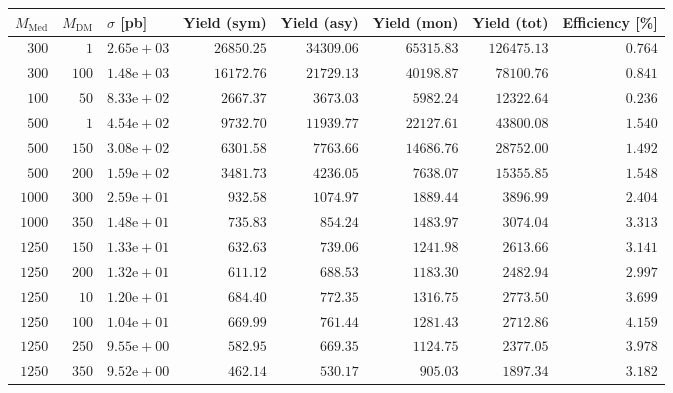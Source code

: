 \begin{table}
    \centering
    {\small
    \begin{tabular}{rrlrrrrr}
    \hline\hline
    $M_{\text{Med}}$ & $M_{\text{DM}}$ & $\sigma$ [pb] & Yield (sym) & Yield (asy) & Yield (mon) & Yield (tot) & Efficiency [\%] \\
    \hline
    $300$ & $1$ & $2.65\text{e}+03$ & $26850.25$ & $34309.06$ & $65315.83$ & $126475.13$ & $0.764$ \\
    $300$ & $100$ & $1.48\text{e}+03$ & $16172.76$ & $21729.13$ & $40198.87$ & $78100.76$ & $0.841$ \\
    $100$ & $50$ & $8.33\text{e}+02$ & $2667.37$ & $3673.03$ & $5982.24$ & $12322.64$ & $0.236$ \\
    $500$ & $1$ & $4.54\text{e}+02$ & $9732.70$ & $11939.77$ & $22127.61$ & $43800.08$ & $1.540$ \\
    $500$ & $150$ & $3.08\text{e}+02$ & $6301.58$ & $7763.66$ & $14686.76$ & $28752.00$ & $1.492$ \\
    $500$ & $200$ & $1.59\text{e}+02$ & $3481.73$ & $4236.05$ & $7638.07$ & $15355.85$ & $1.548$ \\
    $1000$ & $300$ & $2.59\text{e}+01$ & $932.58$ & $1074.97$ & $1889.44$ & $3896.99$ & $2.404$ \\
    $1000$ & $350$ & $1.48\text{e}+01$ & $735.83$ & $854.24$ & $1483.97$ & $3074.04$ & $3.313$ \\
    $1250$ & $150$ & $1.33\text{e}+01$ & $632.63$ & $739.06$ & $1241.98$ & $2613.66$ & $3.141$ \\
    $1250$ & $200$ & $1.32\text{e}+01$ & $611.12$ & $688.53$ & $1183.30$ & $2482.94$ & $2.997$ \\
    $1250$ & $10$ & $1.20\text{e}+01$ & $684.40$ & $772.35$ & $1316.75$ & $2773.50$ & $3.699$ \\
    $1250$ & $100$ & $1.04\text{e}+01$ & $669.99$ & $761.44$ & $1281.43$ & $2712.86$ & $4.159$ \\
    $1250$ & $250$ & $9.55\text{e}+00$ & $582.95$ & $669.35$ & $1124.75$ & $2377.05$ & $3.978$ \\
    $1250$ & $350$ & $9.52\text{e}+00$ & $462.14$ & $530.17$ & $905.03$ & $1897.34$ & $3.182$ \\

\end{tabular}}
\end{table}
